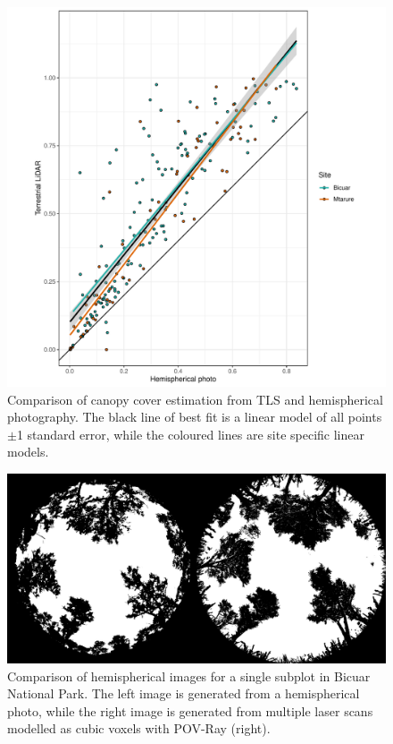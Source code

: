 \documentclass[11pt,a4paper]{article}
\begin{document}
\begin{figure}[H]
\centering
	\includegraphics[width=\textwidth]{tls_hemi_compare}
	\caption{Comparison of canopy cover estimation from TLS and hemispherical photography. The black line of best fit is a linear model of all points $\pm$1 standard error, while the coloured lines are site specific linear models.}
	\label{tls_hemi_compare}
\end{figure}

\begin{figure}[H]
\centering
	\includegraphics[width=\textwidth]{hemi_tls_ex}
	\caption{Comparison of hemispherical images for a single subplot in Bicuar National Park. The left image is generated from a hemispherical photo, while the right image is generated from multiple laser scans modelled as cubic voxels with POV-Ray (right).}
	\label{hemi_tls_ex}
\end{figure}
\end{document}
